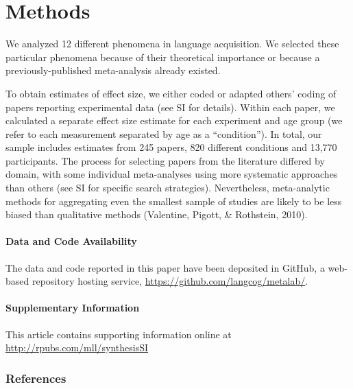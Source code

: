 \documentclass[english,floatsintext,man]{apa6}
\theoremstyle{definition}
\theoremstyle{definition}
\theoremstyle{remark}
\begin{document}
\section{Methods}\label{methods}

We analyzed 12 different phenomena in language acquisition. We selected
these particular phenomena because of their theoretical importance or
because a previously-published meta-analysis already existed.

To obtain estimates of effect size, we either coded or adapted others'
coding of papers reporting experimental data (see SI for details).
Within each paper, we calculated a separate effect size estimate for
each experiment and age group (we refer to each measurement separated by
age as a \enquote{condition}). In total, our sample includes estimates
from 245 papers, 820 different conditions and 13,770 participants. The
process for selecting papers from the literature differed by domain,
with some individual meta-analyses using more systematic approaches than
others (see SI for specific search strategies). Nevertheless,
meta-analytic methods for aggregating even the smallest sample of
studies are likely to be less biased than qualitative methods
(Valentine, Pigott, \& Rothstein, 2010).

\paragraph{Data and Code Availability}\label{data-and-code-availability}

The data and code reported in this paper have been deposited in GitHub,
a web-based repository hosting service,
\url{https://github.com/langcog/metalab/}.

\paragraph{Supplementary Information}\label{supplementary-information}

This article contains supporting information online at
\url{http://rpubs.com/mll/synthesisSI}

\newpage

\subsubsection{References}\label{references}

\setlength{\parindent}{-0.5in} \setlength{\leftskip}{0.5in}
\setlength{\parskip}{8pt}
\end{document}
